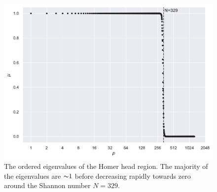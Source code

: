 \begin{figure}[htpb]
    \centering\capstart{}
    \includegraphics[width=\textwidth]{homer_slepian_eigenvalues_b1275.pdf}
    \caption[
        The Slepian eigenvalues of the Homer head region
    ]{
        The ordered eigenvalues of the Homer head region.
        The majority of the eigenvalues are \({\thicksim}\num{1}\) before decreasing rapidly towards zero around the Shannon number \(N=329\).
    }\label{fig:chapter5_slepian_eigenvalues}
\end{figure}
